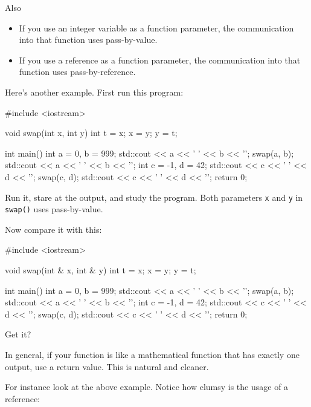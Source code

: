 Also

\begin{itemize}
\item If you use an integer variable as a function parameter, the communication into that function uses pass-by-value.
\item If you use a reference as a function parameter, the communication into that function uses pass-by-reference.
\end{itemize}

Here's another example. First run this program:

\begin{consolethree}[escapeinside=||]
#include <iostream>

void swap(int x, int y)
{
    int t = x;
    x = y;
    y = t;
}

int main()
{
    int a = 0, b = 999;
    std::cout << a << ' ' << b << '\n';
    swap(a, b);
    std::cout << a << ' ' << b << '\n';
    int c = -1, d = 42;
    std::cout << c << ' ' << d << '\n';
    swap(c, d);
    std::cout << c << ' ' << d << '\n';
    return 0;
}
\end{consolethree}

Run it, stare at the output, and study the program. Both parameters \texttt{x} and \texttt{y} in \texttt{swap()} uses pass-by-value.

Now compare it with this:

\begin{consolethree}[escapeinside=||]
#include <iostream>

void swap(int & x, int & y)
{
    int t = x;
    x = y;
    y = t;
}

int main()
{
    int a = 0, b = 999;
    std::cout << a << ' ' << b << '\n';
    swap(a, b);
    std::cout << a << ' ' << b << '\n';
    int c = -1, d = 42;
    std::cout << c << ' ' << d << '\n';
    swap(c, d);
    std::cout << c << ' ' << d << '\n';
    return 0;
}
\end{consolethree}

Get it?






In general, if your function is like a mathematical function that has exactly one output, use a return value. This is natural and cleaner.

For instance look at the above example. Notice how clumsy is the usage of a reference:

